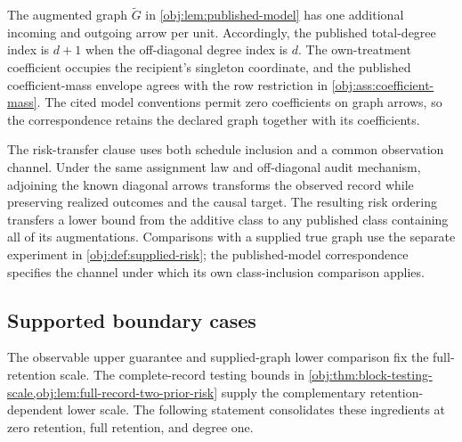 \documentclass[11pt]{article}
\begin{document}

The augmented graph \(\widetilde G\) in \cref{obj:lem:published-model} has one additional incoming and outgoing arrow per unit. Accordingly, the published total-degree index is \(d+1\) when the off-diagonal degree index is \(d\). The own-treatment coefficient occupies the recipient's singleton coordinate, and the published coefficient-mass envelope agrees with the row restriction in \cref{obj:ass:coefficient-mass}. The cited model conventions permit zero coefficients on graph arrows, so the correspondence retains the declared graph together with its coefficients.

The risk-transfer clause uses both schedule inclusion and a common observation channel. Under the same assignment law and off-diagonal audit mechanism, adjoining the known diagonal arrows transforms the observed record while preserving realized outcomes and the causal target. The resulting risk ordering transfers a lower bound from the additive class to any published class containing all of its augmentations. Comparisons with a supplied true graph use the separate experiment in \cref{obj:def:supplied-risk}; the published-model correspondence specifies the channel under which its own class-inclusion comparison applies.

\subsection{Supported boundary cases}

The observable upper guarantee and supplied-graph lower comparison fix the full-retention scale. The complete-record testing bounds in \cref{obj:thm:block-testing-scale,obj:lem:full-record-two-prior-risk} supply the complementary retention-dependent lower scale. The following statement consolidates these ingredients at zero retention, full retention, and degree one.
\end{document}
